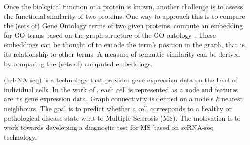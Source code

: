 \documentclass[
	fontsize=10pt, %
	twoside=false, %
	secnumdepth=1, %
  toc=indentunnumbered %
]{kaobook}
\begin{document}
Once the biological function of a protein is known, another challenge is to assess the
functional similarity of two proteins. One way to approach this is to compare
the (sets of) Gene Ontology terms of two given proteins. 
\citeauthor{zhong_GO2VecTransformingGO_2020} compute an embedding for GO terms
based on the graph structure of the GO ontology
\cite{zhong_GO2VecTransformingGO_2020}.
These embeddings can be thought
of to encode the term's position in the graph, that is, its relationship to
other terms. A measure of semantic similarity can be derived by comparing the
(sets of) computed embeddings.

 (scRNA-seq) is a technology that provides gene
expression data on the level of individual cells. In the work of
\citeauthor{ravindra_disease_2020} \cite{ravindra_disease_2020}, each cell is
represented as a node and features are its gene expression data. Graph
connectivity is defined on a node's $k$ nearest neighbours. The goal is to
predict whether a cell corresponds to a healthy or pathological disease state
w.r.t to Multiple Sclerosis (MS). The motivation is to work towards developing a
diagnostic test for MS based on scRNA-seq technology.


\end{document}

